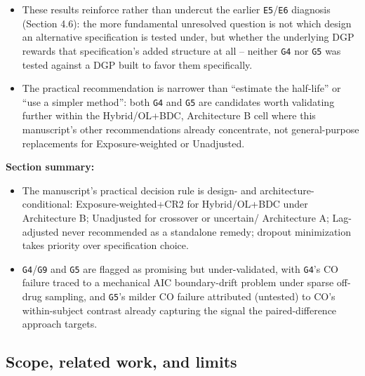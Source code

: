 \documentclass[
  11pt,
]{article}
\providecommand{\tightlist}{%
  \setlength{\itemsep}{0pt}\setlength{\parskip}{0pt}}
\begin{document}
\begin{itemize}
  \begin{itemize}
  \tightlist
  \item
    These results reinforce rather than undercut the earlier
    \texttt{E5}/\texttt{E6} diagnosis (Section 4.6): the more fundamental unresolved
    question is not which design an alternative specification is
    tested under, but whether the underlying DGP rewards that
    specification's added structure at all -- neither \texttt{G4} nor \texttt{G5}
    was tested against a DGP built to favor them specifically.
  \item
    The practical recommendation is narrower than ``estimate the
    half-life'' or ``use a simpler method'': both \texttt{G4} and \texttt{G5} are
    candidates worth validating further within the Hybrid/OL+BDC,
    Architecture B cell where this manuscript's other recommendations
    already concentrate, not general-purpose replacements for
    Exposure-weighted or Unadjusted.
  \end{itemize}
\end{itemize}

\textbf{Section summary:}

\begin{itemize}
\tightlist
\item
  The manuscript's practical decision rule is design- and
  architecture-conditional: Exposure-weighted+CR2 for Hybrid/OL+BDC
  under Architecture B; Unadjusted for crossover or uncertain/
  Architecture A; Lag-adjusted never recommended as a standalone
  remedy; dropout minimization takes priority over specification
  choice.
\item
  \texttt{G4}/\texttt{G9} and \texttt{G5} are flagged as promising but under-validated,
  with \texttt{G4}'s CO failure traced to a mechanical AIC boundary-drift
  problem under sparse off-drug sampling, and \texttt{G5}'s milder CO
  failure attributed (untested) to CO's within-subject contrast
  already capturing the signal the paired-difference approach targets.
\end{itemize}

\subsection{Scope, related work, and limits}\label{scope-related-work-and-limits}
\end{document}
